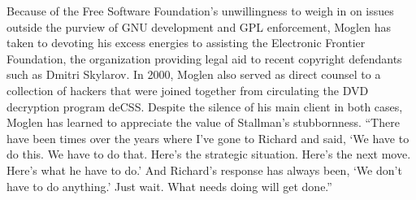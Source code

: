 




\ifdefined\eng
Because of the Free Software Foundation's unwillingness to weigh in on issues outside the purview of GNU development and GPL enforcement, Moglen has taken to devoting his excess energies to assisting the Electronic Frontier Foundation, the organization providing legal aid to recent copyright defendants such as Dmitri Skylarov. In 2000, Moglen also served as direct counsel to a collection of hackers that were joined together from circulating the DVD decryption program deCSS. Despite the silence of his main client in both cases, Moglen has learned to appreciate the value of Stallman's stubbornness. ``There have been times over the years where I've gone to Richard and said, `We have to do this. We have to do that. Here's the strategic situation. Here's the next move. Here's what he have to do.' And Richard's response has always been, `We don't have to do anything.' Just wait. What needs doing will get done.''
\fi

